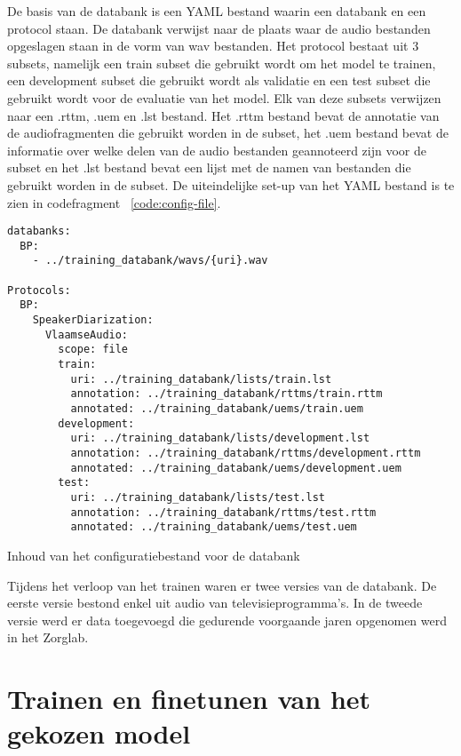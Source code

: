 De basis van de databank is een YAML bestand waarin een databank en een protocol staan. De databank verwijst naar de plaats waar de audio bestanden opgeslagen staan in de vorm van wav bestanden. Het protocol bestaat uit 3 subsets, namelijk een train subset die gebruikt wordt om het model te trainen, een development subset die gebruikt wordt als validatie en een test subset die gebruikt wordt voor de evaluatie van het model. Elk van deze subsets verwijzen naar een .rttm, .uem en .lst bestand. Het .rttm bestand bevat de annotatie van de audiofragmenten die gebruikt worden in de subset, het .uem bestand bevat de informatie over welke delen van de audio bestanden geannoteerd zijn voor de subset en het .lst bestand bevat een lijst met de namen van bestanden die gebruikt worden in de subset. De uiteindelijke set-up van het YAML bestand is te zien in codefragment ~\ref{code:config-file}.

\begin{listing}
	\begin{verbatim}
databanks:
  BP: 
    - ../training_databank/wavs/{uri}.wav

Protocols:
  BP:
    SpeakerDiarization:
      VlaamseAudio:
        scope: file
        train:
          uri: ../training_databank/lists/train.lst
          annotation: ../training_databank/rttms/train.rttm
          annotated: ../training_databank/uems/train.uem
        development:
          uri: ../training_databank/lists/development.lst
          annotation: ../training_databank/rttms/development.rttm
          annotated: ../training_databank/uems/development.uem
        test:
          uri: ../training_databank/lists/test.lst
          annotation: ../training_databank/rttms/test.rttm
          annotated: ../training_databank/uems/test.uem
	\end{verbatim}
	\caption[Configuratie databank]{\label{code:config-file}Inhoud van het configuratiebestand voor de databank}
\end{listing}

Tijdens het verloop van het trainen waren er twee versies van de databank. De eerste versie bestond enkel uit audio van televisieprogramma's. In de tweede versie werd er data toegevoegd die gedurende voorgaande jaren opgenomen werd in het Zorglab.

\section{Trainen en finetunen van het gekozen model}
\label{sec:trainen}

